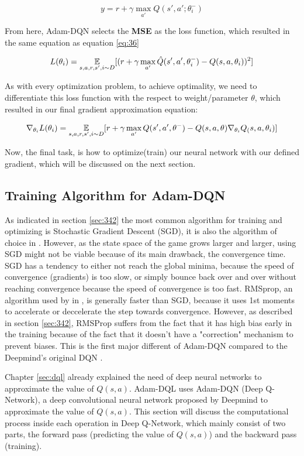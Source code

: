    \begin{equation}
      y=r+\gamma \max_{a'} Q(s',a';\theta_i^-)
   \end{equation}
    
	From here, Adam-DQN selects the \textbf{MSE} as the loss function, which resulted in the same equation as equation \ref{eq:36}
	
	    \begin{equation*}
             L(\theta_i)=\operatorname*{\mathbb{E}}_{s,a,r,s',i \sim D}[(r+\gamma \max_{a'}\hat{Q}(s',a',\theta_i^-)-Q(s,a,\theta_i))^2]
        \end{equation*}
    
    As with every optimization problem, to achieve optimality, we need to differentiate this loss function with the respect to weight/parameter $\theta$, which resulted in our final gradient approximation equation:
    
    \begin{equation}
            \nabla_{\theta_i}L(\theta_i)=\operatorname*{\mathbb{E}}_{s,a,r,s',i \sim D}[r+\gamma  \max_{a'}Q(s',a',\theta^-)-Q(s,a,\theta)\nabla_{\theta_i}Q_(s,a,\theta_i)]
    \end{equation}
    
    Now, the final task, is how to optimize(train) our neural network with our defined gradient, which will be discussed on the next section.
    
    \subsection{Training Algorithm for Adam-DQN}
    
    As indicated in section \ref{sec:342} the most common algorithm for training and optimizing is Stochastic Gradient Descent (SGD), it is also the algorithm of choice in \cite{DBLP:journals/corr/MnihKSGAWR13}. However, as the state space of the game grows larger and larger, using SGD might not be viable because of its main drawback, the convergence time. SGD has a tendency to either not reach the  global minima, because the speed of convergence (gradients) is too slow, or simply bounce back over and over without reaching convergence because the speed of convergence is too fast. RMSprop, an algorithm used by in \cite{mnih2015humanlevel}, is generally faster than SGD, because it uses 1st moments to accelerate or deccelerate the step towards convergence. However, as described in section \ref{sec:342}, RMSProp suffers from the fact that it has high bias early in the training because of the fact that it doesn't have a "correction" mechanism to prevent biases. This is the first major different of Adam-DQN compared to the Deepmind's original DQN \cite{DBLP:journals/corr/MnihKSGAWR13}. 
    \par
     Chapter \ref{sec:dql} already explained the need of deep neural networks to approximate the value of $Q(s,a)$. Adam-DQL uses Adam-DQN (Deep Q-Network), a deep convolutional neural network proposed by Deepmind to approximate the value of $Q(s,a)$. This section will discuss the computational process inside each operation in Deep Q-Network, which mainly consist of two parts, the forward pass (predicting the value of $Q(s,a)$) and the backward pass (training).
